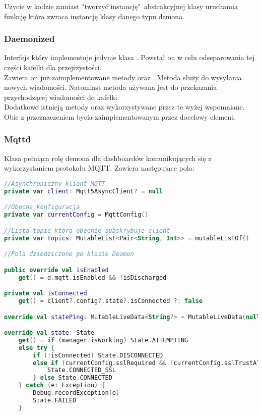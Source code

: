 Użycie w kodzie  zamiast "tworzyć instancję"\ abstrakcyjnej klasy  uruchamia funkcję  która zwraca instancję klasy danego typu demona.

\subsubsection{Daemonized}
Interfejs który implementuje jedynie klasa . Powstał on w celu odseparowania tej części kafelki dla przejrzystości.\\

Zawiera on już zaimplementowane metody  oraz . Metoda  służy do wysyłania nowych wiadomości. Natomiast metoda  używana jest do przekazania przychodzącej wiadomości do kafelki.\\

Dodatkowo istnieją metody  oraz  wykorzystywane przez te wyżej wspomniane. Obie z przeznaczeniem bycia zaimplementowanym przez docelowy element.

\newpage

\subsubsection{Mqttd}
Klasa pełniąca rolę demona dla dashboardów komunikujących się z wykorzystaniem protokołu MQTT. Zawiera następujące pola:

\begin{lstlisting}[language=Kotlin]
//Asynchroniczny klient MQTT
private var client: Mqtt5AsyncClient? = null

//Obecna konfiguracja
private var currentConfig = MqttConfig()

//Lista topic która obecnie subskrybuje client
private var topics: MutableList<Pair<String, Int>> = mutableListOf()

//Pola dziedziczone po klasie Deamon

public override val isEnabled
    get() = d.mqtt.isEnabled && !isDischarged

private val isConnected
    get() = client?.config?.state?.isConnected ?: false

override val statePing: MutableLiveData<String?> = MutableLiveData(null)

override val state: State
    get() = if (manager.isWorking) State.ATTEMPTING
    else try {
        if (!isConnected) State.DISCONNECTED
        else if (currentConfig.sslRequired && !currentConfig.sslTrustAll) {
            State.CONNECTED_SSL
        } else State.CONNECTED
    } catch (e: Exception) {
        Debug.recordException(e)
        State.FAILED
    }
\end{lstlisting}

